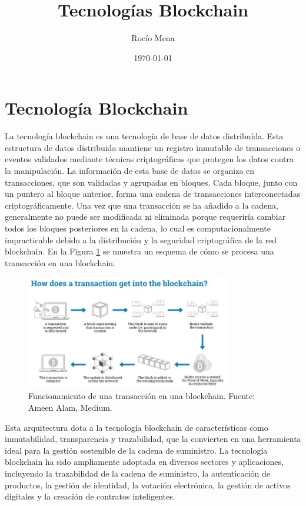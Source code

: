 \documentclass[theoretical-framework.tex]{subfiles}
\title{Tecnologías Blockchain}
\author{Rocío Mena}
\date{\today}
\begin{document}
\section{Tecnología Blockchain}

La tecnología blockchain es una tecnología de base de datos distribuída. Esta estructura de datos distribuida mantiene un registro inmutable de transacciones o eventos validados mediante técnicas criptográficas que protegen los datos contra la manipulación. La información de esta base de datos se organiza en transacciones, que son validadas y agrupadas en bloques. Cada bloque, junto con un puntero al bloque anterior, forma una cadena de transacciones interconectadas criptográficamente. Una vez que una transacción se ha añadido a la cadena, generalmente no puede ser modificada ni eliminada porque requeriría cambiar todos los bloques posteriores en la cadena, lo cual es computacionalmente impracticable debido a la distribución y la seguridad criptográfica de la red blockchain. En la Figura \ref{fig:blockchain} se muestra un esquema de cómo se procesa una transacción en una blockchain.

\begin{figure}[h]
	\centering
	\includegraphics[width=0.8\textwidth]{../assets/blockchain.jpg}
	\caption{Funcionamiento de una transacción en una blockchain. Fuente: Ameen Alam, Medium.}
	\label{fig:blockchain}
\end{figure}

Esta arquitectura dota a la tecnología blockchain de características como inmutabilidad, transparencia y trazabilidad, que la convierten en una herramienta ideal para la gestión sostenible de la cadena de suministro. La tecnología blockchain ha sido ampliamente adoptada en diversos sectores y aplicaciones, incluyendo la trazabilidad de la cadena de suministro, la autenticación de productos, la gestión de identidad, la votación electrónica, la gestión de activos digitales y la creación de contratos inteligentes.
\end{document}
